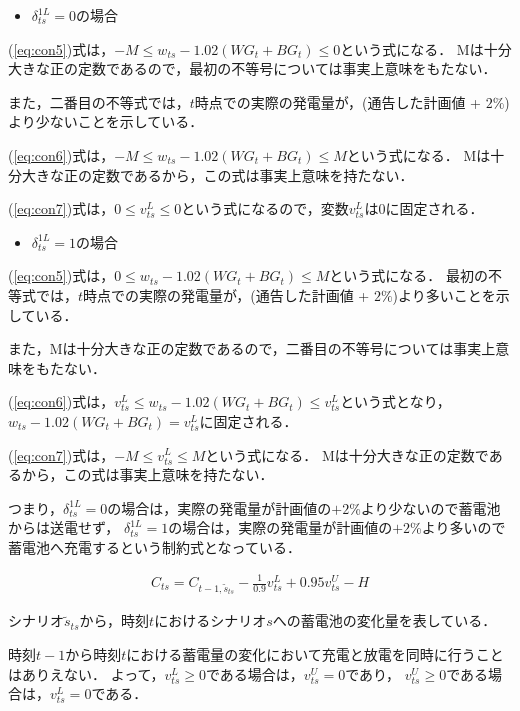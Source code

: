 \documentclass[a4paper,12pt,showkeys]{jreport}
\begin{document}
\begin{itemize}
\item $\delta^{1L}_{ts}$$=0$の場合
\end{itemize}

(\ref{eq:con5})式は，$-M \le w_{ts} - 1.02 (WG_t + BG_t)\le 0$という式になる．
Mは十分大きな正の定数であるので，最初の不等号については事実上意味をもたない．

また，二番目の不等式では，$t$時点での実際の発電量が，(通告した計画値 + $2\%$)より少ないことを示している．

(\ref{eq:con6})式は，$-M \le w_{ts} - 1.02(WG_t + BG_t) \le M$という式になる．
Mは十分大きな正の定数であるから，この式は事実上意味を持たない．

(\ref{eq:con7})式は，$0 \le v^L_{ts} \le 0$という式になるので，変数$v^L_{ts}$は$0$に固定される．

\begin{itemize}
\item $\delta^{1L}_{ts}$$=1$の場合
\end{itemize}

(\ref{eq:con5})式は，$0 \le w_{ts} - 1.02 (WG_t + BG_t)\le M$という式になる．
最初の不等式では，$t$時点での実際の発電量が，(通告した計画値 + $2\%$)より多いことを示している．

また，Mは十分大きな正の定数であるので，二番目の不等号については事実上意味をもたない．

(\ref{eq:con6})式は，$v^L_{ts} \le w_{ts} - 1.02(WG_t + BG_t) \le v^L_{ts}$という式となり，
$w_{ts} - 1.02(WG_t + BG_t) = v^L_{ts}$に固定される．

(\ref{eq:con7})式は，$-M \le v^L_{ts} \le M$という式になる．
Mは十分大きな正の定数であるから，この式は事実上意味を持たない．

つまり，$\delta^{1L}_{ts}$$=0$の場合は，実際の発電量が計画値の$+2$\%より少ないので蓄電池からは送電せず，
$\delta^{1L}_{ts}$$=1$の場合は，実際の発電量が計画値の$+2$\%より多いので蓄電池へ充電するという制約式となっている．



\begin{eqnarray}
C_{ts} = C_{t-1,\tilde{s}_{ts}} - \frac{1}{0.9} v^L_{ts} + 0.95 v^U_{ts} - H
\label{eq:con8}
\end{eqnarray}

シナリオ$\tilde{s}_{ts}$から，時刻$t$におけるシナリオ$s$への蓄電池の変化量を表している．

時刻$t-1$から時刻$t$における蓄電量の変化において充電と放電を同時に行うことはありえない．
よって，$v^L_{ts} \ge 0$である場合は，$v^U_{ts} = 0$であり，
$v^U_{ts} \ge 0$である場合は，$v^L_{ts} = 0$である．
\end{document}
